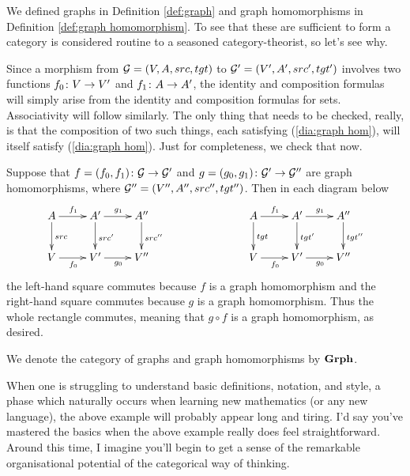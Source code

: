 \documentclass[CT4S-EN-RU]{subfiles}
\begin{document}
\begin{example}

We defined graphs in Definition \ref{def:graph} and graph homomorphisms in Definition \ref{def:graph homomorphism}. To see that these are sufficient to form a category is considered routine to a seasoned category-theorist, so let's see why. 

Since a morphism from $\mathcal{G}=(V,A,src,tgt)$ to $\mathcal{G}'=(V',A',src',tgt')$ involves two functions $f_0\colon V\rightarrow V'$ and $f_1\colon A\rightarrow A'$, the identity and composition formulas will simply arise from the identity and composition formulas for sets. Associativity will follow similarly. The only thing that needs to be checked, really, is that the composition of two such things, each satisfying (\ref{dia:graph hom}), will itself satisfy (\ref{dia:graph hom}). Just for completeness, we check that now.

Suppose that $f=(f_0,f_1)\colon\mathcal{G}\rightarrow\mathcal{G}'$ and $g=(g_0,g_1)\colon\mathcal{G}'\rightarrow\mathcal{G}''$ are graph homomorphisms, where $\mathcal{G}''=(V'',A'',src'',tgt'')$. Then in each diagram below
\begin{align}\label{dia:graph hom comp}
\xymatrix{A\ar[r]^{f_1}\ar[d]^{src}&A'\ar[r]^{g_1}\ar[d]^{src'}&A''\ar[d]^{src''}\\V\ar[r]_{f_0}&V'\ar[r]_{g_0}&V''
}\hspace{1in}
\xymatrix{A\ar[r]^{f_1}\ar[d]^{tgt}&A'\ar[d]^{tgt'}\ar[r]^{g_1}&A''\ar[d]^{tgt''}\\V\ar[r]_{f_0}&V'\ar[r]_{g_0}&V''
}
\end{align}
the left-hand square commutes because $f$ is a graph homomorphism and the right-hand square commutes because $g$ is a graph homomorphism. Thus the whole rectangle commutes, meaning that $g\circ f$ is a graph homomorphism, as desired. 

We denote the category of graphs and graph homomorphisms by ${\bf Grph}$.

\end{example}

\begin{remark}

When one is struggling to understand basic definitions, notation, and style, a phase which naturally occurs when learning new mathematics (or any new language), the above example will probably appear long and tiring. I'd say you've mastered the basics when the above example really does feel straightforward. Around this time, I imagine you'll begin to get a sense of the remarkable organisational potential of the categorical way of thinking.

\end{remark} 
\end{document}
